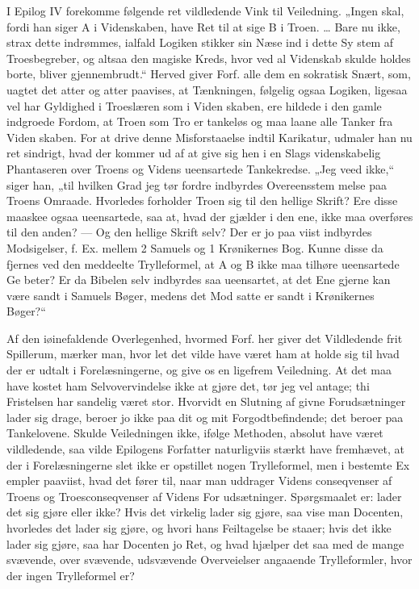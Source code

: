 \documentclass[12pt]{book}
\newcommand{\opage}[1]{\marginnote{\footnotesize\textit{[#1]}}}
\begin{document}
I Epilog IV forekomme følgende ret vildledende Vink
til Veiledning. „Ingen skal, fordi han siger A i Videnskaben,
have Ret til at sige B i Troen. \ldots{} Bare nu ikke, strax dette
indrømmes, ialfald Logiken stikker sin Næse ind i dette Sy\-%
stem af Troesbegreber, og altsaa den magiske Kreds, hvor\-%
\opage{315}\setcounter{footnote}{0}%
ved al Videnskab skulde holdes borte, bliver gjennembrudt.“
Herved giver Forf. alle dem en sokratisk Snært, som, uagtet
det atter og atter paavises, at Tænkningen, følgelig ogsaa
Logiken, ligesaa vel har Gyldighed i Troeslæren som i Viden\-%
skaben, ere hildede i den gamle indgroede Fordom, at Troen
som Tro er tankeløs og maa laane alle Tanker fra Viden\-%
skaben. For at drive denne Misforstaaelse indtil Karikatur,
udmaler han nu ret sindrigt, hvad der kommer ud af at give
sig hen i en Slags videnskabelig Phantaseren over Troens og
Videns ueensartede Tankekredse. „Jeg veed ikke,“ siger han,
„til hvilken Grad jeg tør fordre indbyrdes Overeensstem\-%
melse paa Troens Omraade. Hvorledes forholder Troen sig
til den hellige Skrift? Ere disse maaskee ogsaa ueensartede,
saa at, hvad der gjælder i den ene, ikke maa overføres til
den anden? --- Og den hellige Skrift selv? Der er jo paa\-%
viist indbyrdes Modsigelser, f. Ex. mellem 2 Samuels og 1
Krønikernes Bog. Kunne disse da fjernes ved den meddeelte
Trylleformel, at A og B ikke maa tilhøre ueensartede Ge\-%
beter? Er da Bibelen selv indbyrdes saa ueensartet, at det
Ene gjerne kan være sandt i Samuels Bøger, medens det Mod\-%
satte er sandt i Krønikernes Bøger?“

Af den iøinefaldende Overlegenhed, hvormed Forf. her
giver det Vildledende frit Spillerum, mærker man, hvor let
det vilde have været ham at holde sig til hvad der er udtalt
i Forelæsningerne, og give os en ligefrem Veiledning. At
det maa have kostet ham Selvovervindelse ikke at gjøre det,
tør jeg vel antage; thi Fristelsen har sandelig været stor.
Hvorvidt en Slutning af givne Forudsætninger lader sig drage,
beroer jo ikke paa dit og mit Forgodtbefindende; det beroer
paa Tankelovene. Skulde Veiledningen ikke, ifølge Methoden,
absolut have været vildledende, saa vilde Epilogens Forfatter
naturligviis stærkt have fremhævet, at der i Forelæsningerne
slet ikke er opstillet nogen Trylleformel, men i bestemte Ex\-%
empler paaviist, hvad det fører til, naar man uddrager Videns\-%
\opage{316}\setcounter{footnote}{0}%
conseqvenser af Troens og Troesconseqvenser af Videns For\-%
udsætninger. Spørgsmaalet er: lader det sig gjøre eller ikke?
Hvis det virkelig lader sig gjøre, saa vise man Docenten,
hvorledes det lader sig gjøre, og hvori hans Feiltagelse be\-%
staaer; hvis det ikke lader sig gjøre, saa har Docenten jo
Ret, og hvad hjælper det saa med de mange svævende, over\-%
svævende, udsvævende Overveielser angaaende Trylleformler,
hvor der ingen Trylleformel er?
\end{document}
